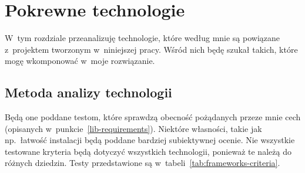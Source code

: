 
\chapter{Pokrewne technologie}
\label{similar-technologies}
W~tym rozdziale przeanalizuję technologie, które według mnie są powiązane z~projektem tworzonym w~niniejszej pracy.
Wśród nich będę szukał takich, które mogę wkomponować w~moje rozwiązanie.

\section{Metoda analizy technologii}
Będą one poddane testom, które sprawdzą obecność pożądanych przeze mnie cech (opisanych w~punkcie~\ref{lib-requirements}).
Niektóre własności, takie jak np.\ łatwość instalacji będą poddane bardziej subiektywnej ocenie.
Nie wszystkie testowane kryteria będą dotyczyć wszystkich technologii, ponieważ te należą do różnych dziedzin.
Testy przedstawione są w~tabeli~\ref{tab:frameworks-criteria}.


